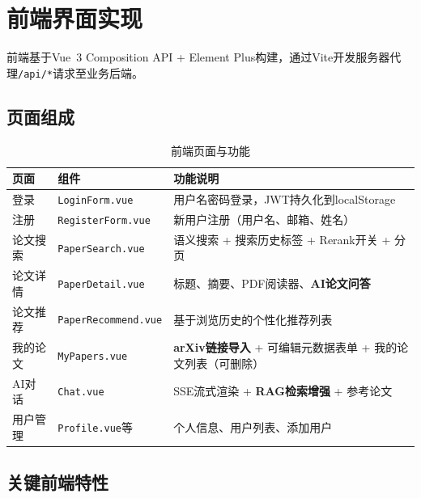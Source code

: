 \documentclass[12pt,a4paper]{ctexart}
\newcommand{\code}[1]{\texttt{#1}}
\begin{document}
\section{前端界面实现}

前端基于Vue~3 Composition API + Element Plus构建，通过Vite开发服务器代理\code{/api/*}请求至业务后端。

\subsection{页面组成}

\begin{table}[H]
\centering
\caption{前端页面与功能}
\begin{tabular}{llp{7cm}}
\toprule
\textbf{页面} & \textbf{组件} & \textbf{功能说明} \\
\midrule
登录      & \code{LoginForm.vue}     & 用户名密码登录，JWT持久化到localStorage \\
注册      & \code{RegisterForm.vue}  & 新用户注册（用户名、邮箱、姓名）\\
论文搜索  & \code{PaperSearch.vue}   & 语义搜索 + 搜索历史标签 + Rerank开关 + 分页 \\
论文详情  & \code{PaperDetail.vue}   & 标题、摘要、PDF阅读器、\textbf{AI论文问答} \\
论文推荐  & \code{PaperRecommend.vue}& 基于浏览历史的个性化推荐列表 \\
我的论文  & \code{MyPapers.vue}      & \textbf{arXiv链接导入} + 可编辑元数据表单 + 我的论文列表（可删除）\\
AI对话    & \code{Chat.vue}          & SSE流式渲染 + \textbf{RAG检索增强} + 参考论文 \\
用户管理  & \code{Profile.vue}等     & 个人信息、用户列表、添加用户 \\
\bottomrule
\end{tabular}
\end{table}

\subsection{关键前端特性}
\end{document}
